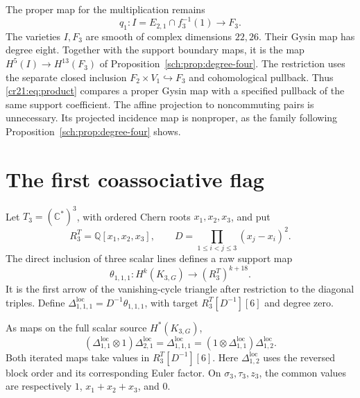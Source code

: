 The proper map for the multiplication remains
\[
 q_1:I=E_{2,1}\cap f_3^{-1}(1)\longrightarrow F_3.
\]
The varieties $I,F_3$ are smooth of complex dimensions $22,26$.
Their Gysin map has degree eight.
Together with the support boundary maps, it is the map
$H^5(I)\to H^{13}(F_3)$ of
Proposition~\ref{sch:prop:degree-four}.
The restriction uses the separate closed inclusion
$F_2\times V_1\hookrightarrow F_3$ and cohomological pullback.
Thus \eqref{cr21:eq:product} compares a proper Gysin map with a
specified pullback of the same support coefficient.
The affine projection to noncommuting pairs is unnecessary.
Its projected incidence map is nonproper, as the family following
Proposition~\ref{sch:prop:degree-four} shows.

\section{The first coassociative flag}
\label{cr21:sec:coassoc}

Let $T_3=(\mathbb C^*)^3$, with ordered Chern roots $x_1,x_2,x_3$,
and put
\[
 R_3^T=\mathbb Q[x_1,x_2,x_3],\qquad
 D=\prod_{1\leq i<j\leq3}(x_j-x_i)^2.
\]
The direct inclusion of three scalar lines defines a raw support map
\[
 \theta_{1,1,1}:H^k(K_{3,G})\longrightarrow (R_3^T)^{k+18}.
\]
It is the first arrow of the vanishing-cycle triangle after restriction
to the diagonal triples.
Define $\Delta_{1,1,1}^{\mathrm{loc}}=D^{-1}\theta_{1,1,1}$,
with target $R_3^T[D^{-1}][6]$ and degree zero.

\begin{theorem}
\label{cr21:thm:coassoc}
As maps on the full scalar source $H^*(K_{3,G})$,
\begin{equation}
 (\Delta_{1,1}^{\mathrm{loc}}\otimes1)\Delta_{2,1}^{\mathrm{loc}}
 =\Delta_{1,1,1}^{\mathrm{loc}}
 =(1\otimes\Delta_{1,1}^{\mathrm{loc}})\Delta_{1,2}^{\mathrm{loc}}.
 \label{cr21:eq:coassoc}
\end{equation}
Both iterated maps take values in $R_3^T[D^{-1}][6]$.
Here $\Delta_{1,2}^{\mathrm{loc}}$ uses the reversed block order
and its corresponding Euler factor.
On $\sigma_3,\tau_3,z_3$, the common values are respectively
$1$, $x_1+x_2+x_3$, and $0$.
\end{theorem}

